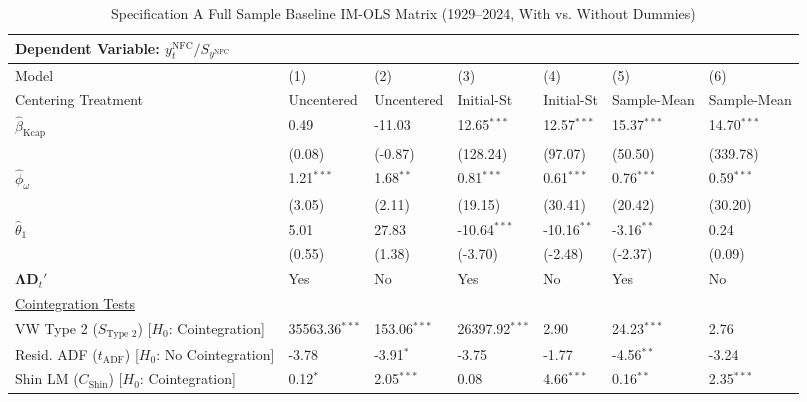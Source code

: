 \begin{landscape}
\begin{table}[H]
\centering
\caption{Specification A Full Sample Baseline IM-OLS Matrix (1929--2024, With vs. Without Dummies)}
\label{tab:specA_fullsample}
\small
\begin{tabular}{p{5.2cm}p{1.8cm}p{1.8cm}p{1.8cm}p{1.8cm}p{1.8cm}p{1.8cm}}
\toprule
\multicolumn{7}{l}{\textbf{Dependent Variable: $y_t^{\text{NFC}} / S_{y^{\text{NFC}}}$}} \\
\midrule
Model & (1) & (2) & (3) & (4) & (5) & (6)  \\
Centering Treatment & Uncentered & Uncentered & Initial-St & Initial-St & Sample-Mean & Sample-Mean  \\
\midrule
$\hat{\beta}_{\text{Kcap}}$ & 0.49 & -11.03 & 12.65$^{***}$ & 12.57$^{***}$ & 15.37$^{***}$ & 14.70$^{***}$  \\
 & {\scriptsize (0.08)} & {\scriptsize (-0.87)} & {\scriptsize (128.24)} & {\scriptsize (97.07)} & {\scriptsize (50.50)} & {\scriptsize (339.78)}  \\
$\hat{\phi}_{\omega}$ & 1.21$^{***}$ & 1.68$^{**}$ & 0.81$^{***}$ & 0.61$^{***}$ & 0.76$^{***}$ & 0.59$^{***}$  \\
 & {\scriptsize (3.05)} & {\scriptsize (2.11)} & {\scriptsize (19.15)} & {\scriptsize (30.41)} & {\scriptsize (20.42)} & {\scriptsize (30.20)}  \\
$\hat{\theta}_{1}$ & 5.01 & 27.83 & -10.64$^{***}$ & -10.16$^{**}$ & -3.16$^{**}$ & 0.24  \\
 & {\scriptsize (0.55)} & {\scriptsize (1.38)} & {\scriptsize (-3.70)} & {\scriptsize (-2.48)} & {\scriptsize (-2.37)} & {\scriptsize (0.09)}  \\
$\boldsymbol{\Lambda} \mathbf{D}_t'$ & Yes & No & Yes & No & Yes & No  \\
\midrule
\multicolumn{7}{l}{\underline{Cointegration Tests}} \\
\makecell[l]{VW Type 2 ($S_{\text{Type 2}}$) \\ {\scriptsize [$H_0$: Cointegration]}} & 35563.36$^{***}$ & 153.06$^{***}$ & 26397.92$^{***}$ & 2.90 & 24.23$^{***}$ & 2.76  \\
\makecell[l]{Resid. ADF ($t_{\text{ADF}}$) \\ {\scriptsize [$H_0$: No Cointegration]}} & -3.78 & -3.91$^{*}$ & -3.75 & -1.77 & -4.56$^{**}$ & -3.24  \\
\makecell[l]{Shin LM ($C_{\text{Shin}}$) \\ {\scriptsize [$H_0$: Cointegration]}} & 0.12$^{*}$ & 2.05$^{***}$ & 0.08 & 4.66$^{***}$ & 0.16$^{**}$ & 2.35$^{***}$  \\

\end{tabular}
\end{table}
\end{landscape}
